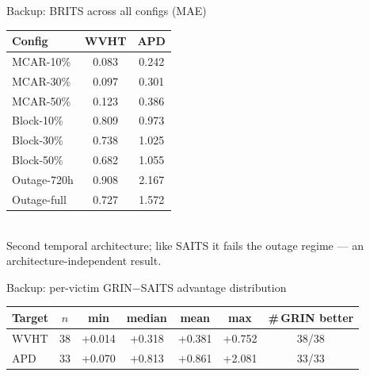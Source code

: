 \documentclass[aspectratio=169]{beamer}
\begin{document}
\begin{frame}{Backup: BRITS across all configs (MAE)}
  \begin{center}\footnotesize
  \begin{tabular}{l cc}
    \toprule
    Config & WVHT & APD\\
    \midrule
MCAR-10\% & 0.083 & 0.242 \\
MCAR-30\% & 0.097 & 0.301 \\
MCAR-50\% & 0.123 & 0.386 \\
Block-10\% & 0.809 & 0.973 \\
Block-30\% & 0.738 & 1.025 \\
Block-50\% & 0.682 & 1.055 \\
Outage-720h & 0.908 & 2.167 \\
Outage-full & 0.727 & 1.572 \\
    \bottomrule
  \end{tabular}\\[0.5ex]
  {\footnotesize Second temporal architecture; like SAITS it fails the outage regime --- an architecture-independent result.}
  \end{center}
\end{frame}

\begin{frame}{Backup: per-victim GRIN$-$SAITS advantage distribution}
  \begin{center}\footnotesize
  \begin{tabular}{l c ccc c c}
    \toprule
    Target & $n$ & min & median & mean & max & \#\,GRIN better\\
    \midrule
WVHT & 38 & +0.014 & +0.318 & +0.381 & +0.752 & 38/38 \\
APD & 33 & +0.070 & +0.813 & +0.861 & +2.081 & 33/33 \\
    \bottomrule
  \end{tabular}
  \end{center}
\end{frame}
\end{document}
